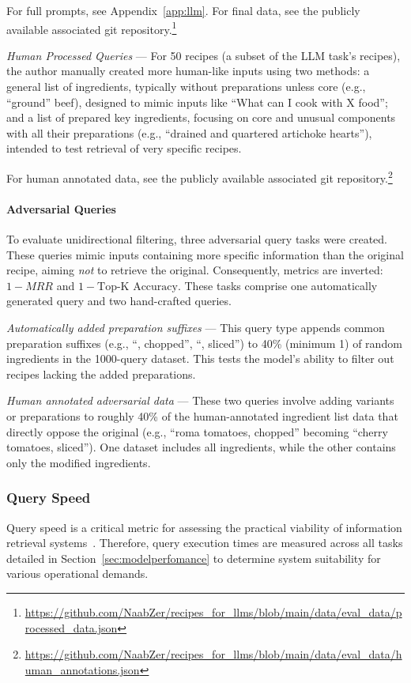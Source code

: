 \documentclass[11pt]{article}
\begin{document}
For full prompts, see Appendix~\ref{app:llm}. For final data, see the publicly
available associated git
repository.\footnote{\url{https://github.com/NaabZer/recipes_for_llms/blob/main/data/eval_data/processed_data.json}}

\emph{Human Processed Queries} --- For 50 recipes (a subset of the LLM task's
recipes), the author manually created more human-like inputs using two methods:
a general list of ingredients, typically without preparations unless core (e.g.,
``ground'' beef), designed to mimic inputs like ``What can I cook with X
food''; and a list of prepared key ingredients, focusing on core and unusual
components with all their preparations (e.g., ``drained and quartered artichoke
hearts''), intended to test retrieval of very specific recipes.

For human annotated data, see the publicly available associated git
repository.\footnote{\url{https://github.com/NaabZer/recipes_for_llms/blob/main/data/eval_data/human_annotations.json}} 

\paragraph{Adversarial Queries}
To evaluate unidirectional filtering, three adversarial query tasks were created.
These queries mimic inputs containing more specific information than the
original recipe, aiming \emph{not} to retrieve the original.
Consequently, metrics are inverted: $1-MRR$ and $1-\text{Top-K Accuracy}$.
These tasks comprise one automatically generated query and two hand-crafted queries.

\emph{Automatically added preparation suffixes} --- This query type appends
common preparation suffixes (e.g., ``, chopped'', ``, sliced'') to 40\% (minimum
1) of random ingredients in the 1000-query dataset.
This tests the model's ability to filter out recipes lacking the added preparations.

\emph{Human annotated adversarial data} --- These two queries involve adding
variants or preparations to roughly 40\% of the human-annotated ingredient list
data that directly oppose the original (e.g., ``roma tomatoes, chopped''
becoming ``cherry tomatoes, sliced'').
One dataset includes all ingredients, while the other contains only the modified
ingredients.

\subsubsection{Query Speed}
Query speed is a critical metric for assessing the practical viability of
information retrieval systems~\cite{manning2009introduction}.
Therefore, query execution times are measured across all tasks detailed in
Section~\ref{sec:modelperfomance} to determine system suitability for various
operational demands.
\end{document}
